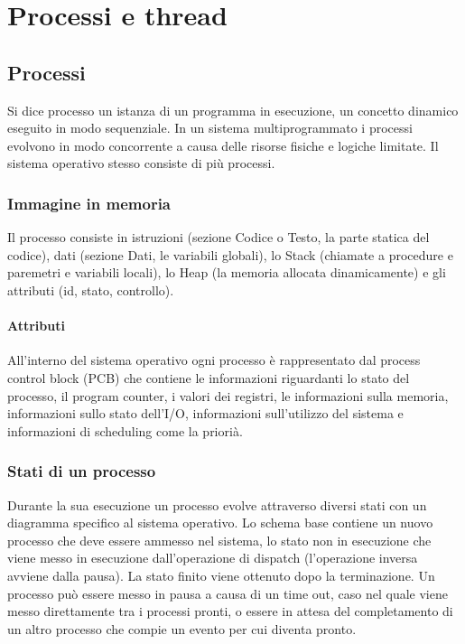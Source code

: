 \chapter{Processi e thread}
\section{Processi}
Si dice processo un istanza di un programma in esecuzione, un concetto dinamico eseguito in modo sequenziale. In un sistema multiprogrammato i processi evolvono in modo concorrente a 
causa delle risorse fisiche e logiche limitate. Il sistema operativo stesso consiste di pi\`u processi. 
\subsection{Immagine in memoria}
Il processo consiste in istruzioni (sezione Codice o Testo, la parte statica del codice), dati (sezione Dati, le variabili globali), lo Stack (chiamate a procedure e paremetri e 
variabili locali), lo Heap (la memoria allocata dinamicamente) e gli attributi (id, stato, controllo).
\subsubsection{Attributi}
All'interno del sistema operativo ogni processo \`e rappresentato dal process control block (PCB) che contiene le informazioni riguardanti lo stato del processo, il program counter, 
i valori dei registri, le informazioni sulla memoria, informazioni sullo stato dell'I/O, informazioni sull'utilizzo del sistema e informazioni di scheduling come la priori\`a. 
\subsection{Stati di un processo}
Durante la sua esecuzione un processo evolve attraverso diversi stati con un diagramma specifico al sistema operativo. Lo schema base contiene un nuovo processo che deve essere 
ammesso nel sistema, lo stato non in esecuzione che viene messo in esecuzione dall'operazione di dispatch (l'operazione inversa avviene dalla pausa). La stato finito viene ottenuto
dopo la terminazione. Un processo pu\`o essere messo in pausa a causa di un time out, caso nel quale viene messo direttamente tra i processi pronti, o essere in attesa del completamento 
di un altro processo che compie un evento per cui diventa pronto. 
